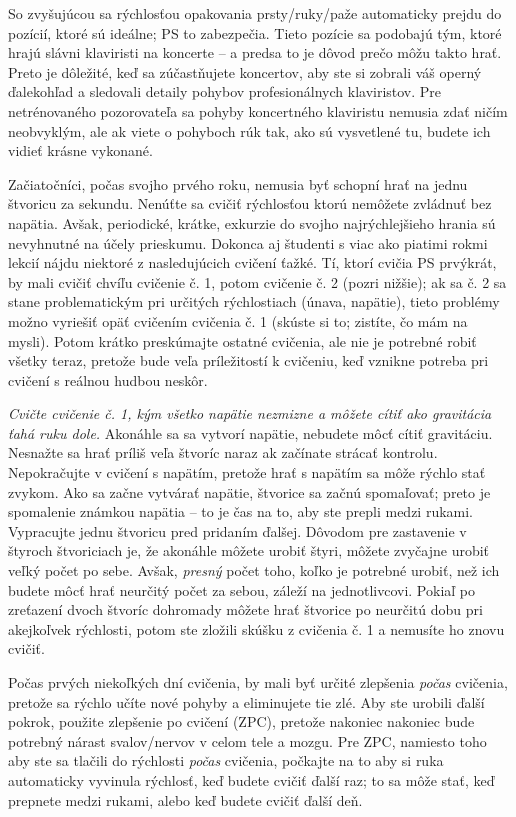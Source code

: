 So zvyšujúcou sa rýchlosťou opakovania prsty/ruky/paže automaticky prejdu do pozícií, ktoré sú ideálne; PS to zabezpečia. Tieto pozície sa podobajú tým, ktoré hrajú slávni klaviristi na koncerte – a predsa to je dôvod prečo môžu takto hrať. Preto je dôležité, keď sa zúčastňujete koncertov, aby ste si zobrali váš operný ďalekohľad a sledovali detaily pohybov profesionálnych klaviristov. Pre netrénovaného pozorovateľa sa pohyby koncertného klaviristu nemusia zdať ničím neobvyklým, ale ak viete o pohyboch rúk tak, ako sú vysvetlené tu, budete ich vidieť krásne vykonané.

Začiatočníci, počas svojho prvého roku, nemusia byť schopní hrať na jednu štvoricu za sekundu. Nenúťte sa cvičiť rýchlosťou ktorú nemôžete zvládnuť bez napätia. Avšak, periodické, krátke, exkurzie do svojho najrýchlejšieho hrania sú nevyhnutné na účely prieskumu. Dokonca aj študenti s viac ako piatimi rokmi lekcií nájdu niektoré z nasledujúcich cvičení ťažké. Tí, ktorí cvičia PS prvýkrát, by mali cvičiť chvíľu cvičenie č. 1, potom cvičenie č. 2 (pozri nižšie); ak sa č. 2 sa stane problematickým pri určitých rýchlostiach (únava, napätie), tieto problémy možno vyriešiť opäť cvičením cvičenia č. 1 (skúste si to; zistíte, čo mám na mysli). Potom krátko preskúmajte ostatné cvičenia, ale nie je potrebné robiť všetky teraz, pretože bude veľa príležitostí k cvičeniu, keď vznikne potreba pri cvičení s reálnou hudbou neskôr.

\emph{Cvičte cvičenie č. 1, kým všetko napätie nezmizne a môžete cítiť ako gravitácia ťahá ruku dole.} Akonáhle sa sa vytvorí napätie, nebudete môcť cítiť gravitáciu. Nesnažte sa hrať príliš veľa štvoríc naraz ak začínate strácať kontrolu. Nepokračujte v cvičení s napätím, pretože hrať s napätím sa môže rýchlo stať zvykom. Ako sa začne vytvárať napätie, štvorice sa začnú spomaľovať; preto je spomalenie známkou napätia – to je čas na to, aby ste prepli medzi rukami. Vypracujte jednu štvoricu pred pridaním ďalšej. Dôvodom pre zastavenie v štyroch štvoriciach je, že akonáhle môžete urobiť štyri, môžete zvyčajne urobiť veľký počet po sebe. Avšak, \textit{presný} počet toho, koľko je potrebné urobiť, než ich budete môcť hrať neurčitý počet za sebou, záleží na jednotlivcovi. Pokiaľ po zreťazení dvoch štvoríc dohromady môžete hrať štvorice po neurčitú dobu pri akejkoľvek rýchlosti, potom ste zložili skúšku z cvičenia č. 1 a nemusíte ho znovu cvičiť.

Počas prvých niekoľkých dní cvičenia, by mali byť určité zlepšenia \textit{počas} cvičenia, pretože sa rýchlo učíte nové pohyby a eliminujete tie zlé. Aby ste urobili ďalší pokrok, použite zlepšenie po cvičení (ZPC), pretože nakoniec nakoniec bude potrebný nárast svalov/nervov v celom tele a mozgu. Pre ZPC, namiesto toho aby ste sa tlačili do rýchlosti \textit{počas} cvičenia, počkajte na to aby si ruka automaticky vyvinula rýchlosť, keď budete cvičiť ďalší raz; to sa môže stať, keď prepnete medzi rukami, alebo keď budete cvičiť ďalší deň.

